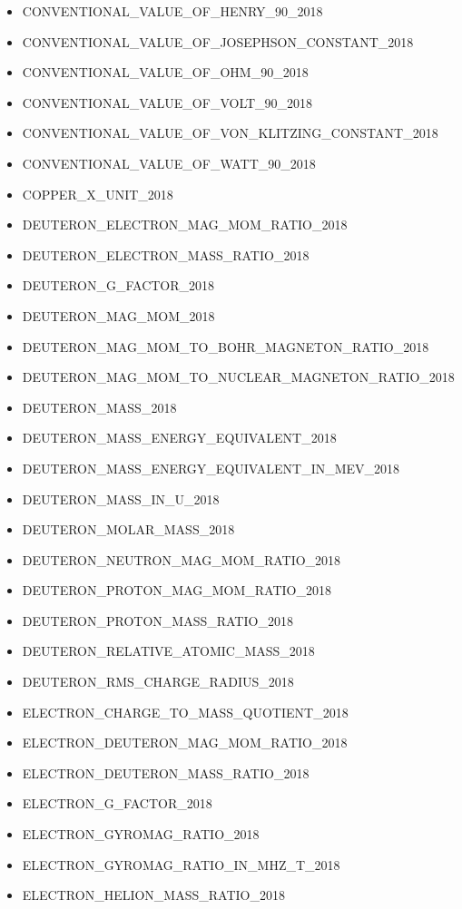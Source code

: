 \begin{itemize}
  CONVENTIONAL\_VALUE\_OF\_FARAD\_90\_2018
\item
  CONVENTIONAL\_VALUE\_OF\_HENRY\_90\_2018
\item
  CONVENTIONAL\_VALUE\_OF\_JOSEPHSON\_CONSTANT\_2018
\item
  CONVENTIONAL\_VALUE\_OF\_OHM\_90\_2018
\item
  CONVENTIONAL\_VALUE\_OF\_VOLT\_90\_2018
\item
  CONVENTIONAL\_VALUE\_OF\_VON\_KLITZING\_CONSTANT\_2018
\item
  CONVENTIONAL\_VALUE\_OF\_WATT\_90\_2018
\item
  COPPER\_X\_UNIT\_2018
\item
  DEUTERON\_ELECTRON\_MAG\_MOM\_RATIO\_2018
\item
  DEUTERON\_ELECTRON\_MASS\_RATIO\_2018
\item
  DEUTERON\_G\_FACTOR\_2018
\item
  DEUTERON\_MAG\_MOM\_2018
\item
  DEUTERON\_MAG\_MOM\_TO\_BOHR\_MAGNETON\_RATIO\_2018
\item
  DEUTERON\_MAG\_MOM\_TO\_NUCLEAR\_MAGNETON\_RATIO\_2018
\item
  DEUTERON\_MASS\_2018
\item
  DEUTERON\_MASS\_ENERGY\_EQUIVALENT\_2018
\item
  DEUTERON\_MASS\_ENERGY\_EQUIVALENT\_IN\_MEV\_2018
\item
  DEUTERON\_MASS\_IN\_U\_2018
\item
  DEUTERON\_MOLAR\_MASS\_2018
\item
  DEUTERON\_NEUTRON\_MAG\_MOM\_RATIO\_2018
\item
  DEUTERON\_PROTON\_MAG\_MOM\_RATIO\_2018
\item
  DEUTERON\_PROTON\_MASS\_RATIO\_2018
\item
  DEUTERON\_RELATIVE\_ATOMIC\_MASS\_2018
\item
  DEUTERON\_RMS\_CHARGE\_RADIUS\_2018
\item
  ELECTRON\_CHARGE\_TO\_MASS\_QUOTIENT\_2018
\item
  ELECTRON\_DEUTERON\_MAG\_MOM\_RATIO\_2018
\item
  ELECTRON\_DEUTERON\_MASS\_RATIO\_2018
\item
  ELECTRON\_G\_FACTOR\_2018
\item
  ELECTRON\_GYROMAG\_RATIO\_2018
\item
  ELECTRON\_GYROMAG\_RATIO\_IN\_MHZ\_T\_2018
\item
  ELECTRON\_HELION\_MASS\_RATIO\_2018

\end{itemize}
